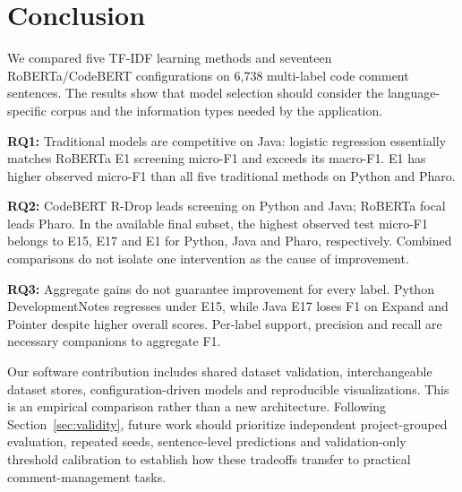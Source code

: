 \section{Conclusion}
We compared five TF-IDF learning methods and seventeen RoBERTa/CodeBERT configurations on 6,738 multi-label code comment sentences. The results show that model selection should consider the language-specific corpus and the information types needed by the application.

\textbf{RQ1:} Traditional models are competitive on Java: logistic regression essentially matches RoBERTa E1 screening micro-F1 and exceeds its macro-F1. E1 has higher observed micro-F1 than all five traditional methods on Python and Pharo.

\textbf{RQ2:} CodeBERT R-Drop leads screening on Python and Java; RoBERTa focal leads Pharo. In the available final subset, the highest observed test micro-F1 belongs to E15, E17 and E1 for Python, Java and Pharo, respectively. Combined comparisons do not isolate one intervention as the cause of improvement.

\textbf{RQ3:} Aggregate gains do not guarantee improvement for every label. Python DevelopmentNotes regresses under E15, while Java E17 loses F1 on Expand and Pointer despite higher overall scores. Per-label support, precision and recall are necessary companions to aggregate F1.

Our software contribution includes shared dataset validation, interchangeable dataset stores, configuration-driven models and reproducible visualizations. This is an empirical comparison rather than a new architecture. Following Section~\ref{sec:validity}, future work should prioritize independent project-grouped evaluation, repeated seeds, sentence-level predictions and validation-only threshold calibration to establish how these tradeoffs transfer to practical comment-management tasks.
